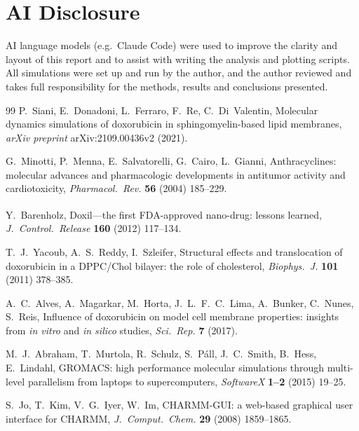 \documentclass[11pt,a4paper]{article}
\begin{document}
\section*{AI Disclosure}
AI language models (e.g.\ Claude Code) were used to improve the clarity and layout of this report and to
assist with writing the analysis and plotting scripts. All simulations were set up and run by the author,
and the author reviewed and takes full responsibility for the methods, results and conclusions presented.

\FloatBarrier
{}
{}
\begin{thebibliography}{99}
\small
{}
P.~Siani, E.~Donadoni, L.~Ferraro, F.~Re, C.~Di~Valentin,
Molecular dynamics simulations of doxorubicin in sphingomyelin-based lipid membranes,
\emph{arXiv preprint} arXiv:2109.00436v2 (2021).

G.~Minotti, P.~Menna, E.~Salvatorelli, G.~Cairo, L.~Gianni,
Anthracyclines: molecular advances and pharmacologic developments in antitumor activity and cardiotoxicity,
\emph{Pharmacol.\ Rev.} \textbf{56} (2004) 185--229.

Y.~Barenholz, Doxil\textsuperscript{\textregistered}---the first FDA-approved nano-drug: lessons learned,
\emph{J.\ Control.\ Release} \textbf{160} (2012) 117--134.

T.~J.~Yacoub, A.~S.~Reddy, I.~Szleifer,
Structural effects and translocation of doxorubicin in a DPPC/Chol bilayer: the role of cholesterol,
\emph{Biophys.\ J.} \textbf{101} (2011) 378--385.

A.~C.~Alves, A.~Magarkar, M.~Horta, J.~L.~F.~C.~Lima, A.~Bunker, C.~Nunes, S.~Reis,
Influence of doxorubicin on model cell membrane properties: insights from \emph{in vitro} and
\emph{in silico} studies, \emph{Sci.\ Rep.} \textbf{7} (2017).

M.~J.~Abraham, T.~Murtola, R.~Schulz, S.~P\'{a}ll, J.~C.~Smith, B.~Hess, E.~Lindahl,
GROMACS: high performance molecular simulations through multi-level parallelism from laptops to
supercomputers, \emph{SoftwareX} \textbf{1--2} (2015) 19--25.

S.~Jo, T.~Kim, V.~G.~Iyer, W.~Im,
CHARMM-GUI: a web-based graphical user interface for CHARMM,
\emph{J.\ Comput.\ Chem.} \textbf{29} (2008) 1859--1865.


\end{thebibliography}
\end{document}
